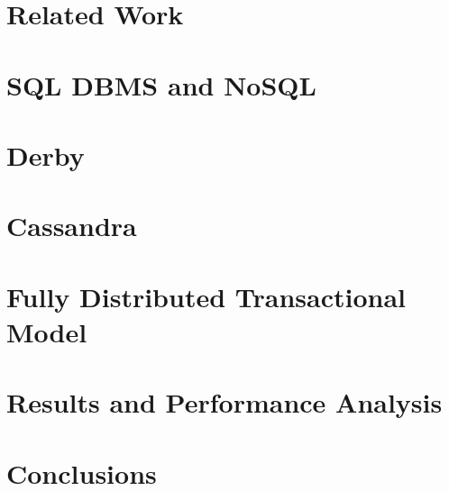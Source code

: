\documentclass[11pt,a4paper,twoside]{book} %
\begin{document}
	\chapter{Related Work}
	    
		\mbox{}	
    \chapter{SQL DBMS and NoSQL}
        
		\mbox{}
    \chapter{Derby}
       
   	   \mbox{}
	\chapter{Cassandra}
       
       \mbox{}
	\chapter{Fully Distributed Transactional Model}
       
   	   \mbox{}
    \chapter{Results and Performance Analysis}
       
   	   \mbox{}	
		\thispagestyle{plain}
		\mbox{}
   \chapter{Conclusions}
   	\newpage
   	\thispagestyle{plain}
   	\mbox{}

%	
	
	
	
	\appendix
\end{document}
